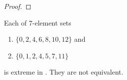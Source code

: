 \begin{proof}

\qedhere
\end{proof}



\begin{prop}\label{prop7in16} Each of 7-element sets
\begin{enumerate}
\item
 $\{0,2,4,6,8,10,12\}$ and 
 \item $\{0,1,2,4,5,7,11\}$  
 \end{enumerate}
 is extreme in .
They are not equivalent.
\end{prop}

